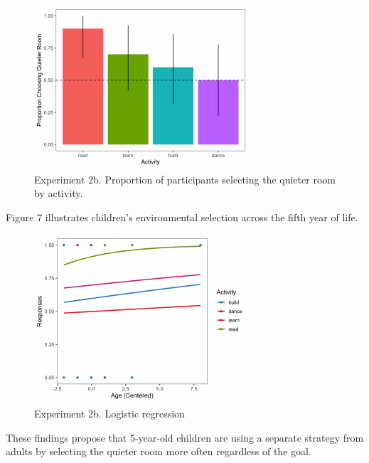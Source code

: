 \documentclass[10pt, letterpaper]{article}
\newenvironment{CodeChunk}{}{}
\begin{document}
\begin{CodeChunk}
\begin{figure}[H]

{\centering \includegraphics{figs/image 6-1} 

}

\caption[Experiment 2b]{Experiment 2b. Proportion of participants selecting the quieter room by activity.}\label{fig:image 6}
\end{figure}
\end{CodeChunk}

Figure 7 illustrates children's environmental selection across the fifth
year of life.

\begin{CodeChunk}
\begin{figure}[H]

{\centering \includegraphics{figs/image 7-1} 

}

\caption[Experiment 2b]{Experiment 2b. Logistic regression}\label{fig:image 7}
\end{figure}
\end{CodeChunk}

These findings propose that 5-year-old children are using a separate
strategy from adults by selecting the quieter room more often regardless
of the goal.
\end{document}
